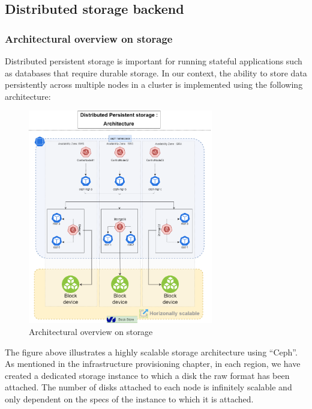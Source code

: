 \newpage

\subsection{Distributed storage backend}

\subsubsection{Architectural overview on storage}

\hspace{7mm}Distributed persistent storage is important for running stateful applications such as databases that require durable storage. In our context, the ability to store data persistently across multiple nodes in a cluster is implemented using the following architecture: 

\begin{figure}[H]\centering
\includegraphics[width=0.72\textwidth,angle=00]{assets/f26.png}
\caption{Architectural overview on storage}
\label{fig:Architectural overview on storage}
\end{figure}

\hspace{7mm}The figure above illustrates a highly scalable storage architecture using “Ceph”. As mentioned in the infrastructure provisioning chapter, in each region, we have created a dedicated storage instance to which a disk the raw format has been attached. The number of disks attached to each node is infinitely scalable and only dependent on the specs of the instance to which it is attached.

